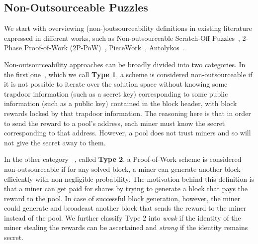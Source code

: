 \documentclass[11pt]{article}
\begin{document}


\subsection{Non-Outsourceable Puzzles}


We start with overviewing (non-)outsourceability definitions in existing literature expressed in different works, such as
Non-outsourceable Scratch-Off Puzzles~\cite{miller2015nonoutsourceable}, 2-Phase Proof-of-Work (2P-PoW)~\cite{twophase},
PieceWork~\cite{daian2017short}, Autolykos~\cite{autolykos}.


Non-outsourceability approaches can be broadly divided into two categories. In the first one~\cite{autolykos, daian2017short, twophase}, which we call \textbf{Type 1}, a scheme is considered
non-outsourceable if it is not possible to iterate over the solution space without knowing some trapdoor information (such as a secret key) corresponding to some public information (such as a public key) contained in the block header, with block rewards locked by that trapdoor information. The reasoning here is that in order to send the reward to a pool's address, each miner must know the secret corresponding to that address. However, a pool does not trust miners and so will not give the secret away to them. 

In the other category
~\cite{miller2015nonoutsourceable}, called \textbf{Type 2}, a Proof-of-Work scheme is considered non-outsourceable if for any solved block, a miner can generate another block efficiently with non-negligible probability. The motivation behind this definition is that a miner can get paid for shares
by trying to generate a block that pays the reward to the pool. In case of successful block generation, however, the miner could generate and broadcast another block that sends the reward to the miner instead of the pool. 
We further classify Type 2 into {\em weak} if the identity of the miner stealing the rewards can be ascertained and {\em strong} if the identity remains secret.
\end{document}
